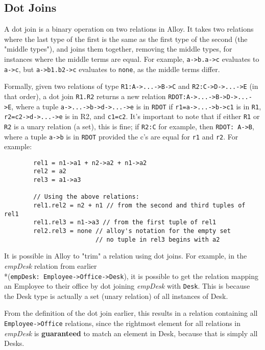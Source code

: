 \documentclass[10pt]{article}
\begin{document}
    \subsection*{Dot Joins}
      A dot join is a binary operation on two relations in Alloy. It takes two relations where the last type of the first is the same as the first type of the second (the "middle types"), and joins them together, removing the middle types, for instances where the middle terms are equal. For example, \lstinline|a->b.a->c| evaluates to \lstinline|a->c|, but \lstinline|a->b1.b2->c| evaluates to \lstinline|none|, as the middle terms differ.\par
      Formally, given two relations of type \lstinline|R1:A->...->B->C| and \lstinline|R2:C->D->...->E| (in that order), a dot join \lstinline|R1.R2| returns a new relation \lstinline|RDOT:A->...->B->D->...->E|, where a tuple \lstinline|a->...->b->d->...->e| is in \lstinline|RDOT| if \lstinline|r1=a->...->b->c1| is in \lstinline|R1|, \lstinline|r2=c2->d->...->e| is in R2, and \lstinline|c1=c2|. It's important to note that if either \lstinline|R1| or \lstinline|R2| is a unary relation (a set), this is fine; if \lstinline|R2:C| for example, then \lstinline|RDOT: A->B|, where a tuple \lstinline|a->b| is in \lstinline|RDOT| provided the c's are equal for \lstinline|r1| and \lstinline|r2|. For example:
      \begin{lstlisting}
        rel1 = n1->a1 + n2->a2 + n1->a2
        rel2 = a2
        rel3 = a1->a3

        // Using the above relations:
        rel1.rel2 = n2 + n1 // from the second and third tuples of rel1
        rel1.rel3 = n1->a3 // from the first tuple of rel1
        rel2.rel3 = none // alloy's notation for the empty set
                         // no tuple in rel3 begins with a2
      \end{lstlisting} \par
      It is possible in Alloy to "trim" a relation using dot joins. For example, in the \textit{empDesk} relation from earlier\\*(\lstinline|empDesk: Employee->Office->Desk|), it is possible to get the relation mapping an Employee to their office by dot joining \textit{empDesk} with \lstinline|Desk|. This is because the Desk type is actually a set (unary relation) of all instances of Desk.\par
      From the definition of the dot join earlier, this results in a relation containing all \lstinline|Employee->Office| relations, since the rightmost element for all relations in \textit{empDesk} is \textbf{guaranteed} to match an element in Desk, because that is simply all Desks.
\end{document}

